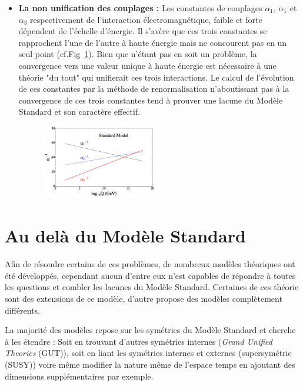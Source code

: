 \begin{itemize}[label=$\bullet$]
\item \textbf{La non unification des couplages : }Les constantes de couplages $\alpha_{1}$, $\alpha_{1}$ et $\alpha_{3}$ respectivement de l'interaction électromagnétique, faible et forte dépendent de l'échelle d'énergie. Il s'avère que ces trois constantes se rapprochent l'une de l'autre à haute énergie mais ne concourent pas en un seul point (cf.Fig~\ref{constantes}). Bien que n'étant pas en soit un problème, la convergence vers une valeur unique à haute énergie est nécessaire à une théorie "du tout" qui unifierait ces trois interactions. Le calcul de l'évolution de ces constantes par la méthode de renormalisation n'aboutissant pas à la convergence de ces trois constantes tend à prouver une lacune du Modèle Standard et son caractère effectif.
\begin{figure}[ht!]
\centering
\includegraphics[width=0.50\textwidth]{SM/couplageSM.jpg}
\label{constantes}
\end{figure}
\end{itemize}

\section{Au delà du Modèle Standard}
Afin de résoudre certains de ces problèmes, de nombreux modèles théoriques ont été développés, cependant aucun d'entre eux n'est capables de répondre à toutes les questions et combler les lacunes du Modèle Standard. Certaines de ces théorie sont des extensions de ce modèle, d'autre propose des modèles complètement différents.

La majorité des modèles repose sur les symétries du Modèle Standard et cherche à les étendre : Soit en trouvant d'autres symétries internes (\textit{Grand Unified Theories} (GUT)), soit en liant les symétries internes et externes (supersymétrie (SUSY)) voire même modifier la nature même de l'espace temps en ajoutant des dimensions supplémentaires par exemple.

